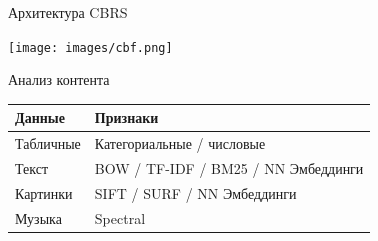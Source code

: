 \documentclass[11pt,aspectratio=169,handout]{beamer}
\begin{document}
\begin{frame}{Архитектура CBRS \cite{RSHB}}

\begin{center}
\texttt{[image: images/cbf.png]}
\end{center}

\end{frame}

\begin{frame}{Анализ контента}

\begin{center}
\begin{tabular}{ l | p{20em} }
{\bf Данные} & {\bf Признаки} \\
\hline
Табличные \pause &  Категориальные / числовые \\
Текст \pause & BOW / TF-IDF / BM25 / NN Эмбеддинги \\
Картинки \pause & SIFT / SURF / NN Эмбеддинги \\
Музыка \pause & Spectral 
\end{tabular}
\end{center}

\end{frame}
\end{document}

